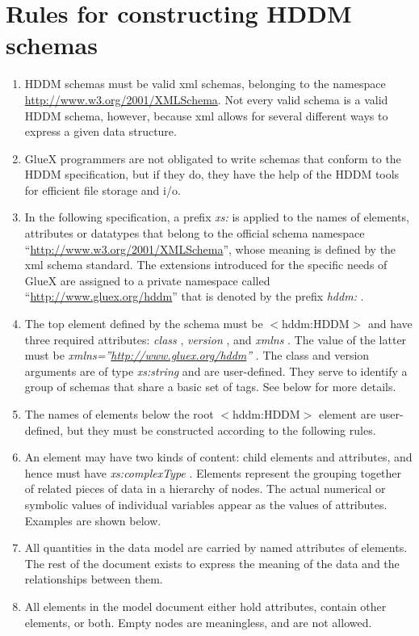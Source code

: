 \documentclass[10pt]{article}
\begin{document}
\section{Rules for constructing HDDM schemas}
\begin{enumerate}
\item  HDDM schemas must be valid xml schemas, belonging to the namespace \url{http://www.w3.org/2001/XMLSchema}. Not every valid schema is a valid HDDM schema, however, because xml allows for several different ways to express a given data structure. 
\item  GlueX programmers are not obligated to write schemas that conform to the HDDM specification, but if they do, they have the help of the HDDM tools for efficient file storage and i/o. 
\item  In the following specification, a prefix \emph{xs:}
 is applied to the names of elements, attributes or datatypes that belong to the official schema namespace ``\url{http://www.w3.org/2001/XMLSchema}'', whose meaning is defined by the xml schema standard. The extensions introduced for the specific needs of GlueX are assigned to a private namespace called ``\url{http://www.gluex.org/hddm}'' that is denoted by the prefix \emph{hddm:}
. 
\item  The top element defined by the schema must be $<$hddm:HDDM$>$ and have three required attributes: \emph{class}
, \emph{version}
, and \emph{xmlns}
. The value of the latter must be \emph{xmlns=''\url{http://www.gluex.org/hddm}''}
. The class and version arguments are of type \emph{xs:string}
 and are user-defined. They serve to identify a group of schemas that share a basic set of tags. See below for more details. 
\item  The names of elements below the root $<$hddm:HDDM$>$ element are user-defined, but they must be constructed according to the following rules. 
\item  An element may have two kinds of content: child elements and attributes, and hence must have \emph{xs:complexType}
. Elements represent the grouping together of related pieces of data in a hierarchy of nodes. The actual numerical or symbolic values of individual variables appear as the values of attributes. Examples are shown below. 
\item  All quantities in the data model are carried by named attributes of elements. The rest of the document exists to express the meaning of the data and the relationships between them. 
\item  All elements in the model document either hold attributes, contain other elements, or both. Empty nodes are meaningless, and are not allowed. 

\end{enumerate}
\end{document}

